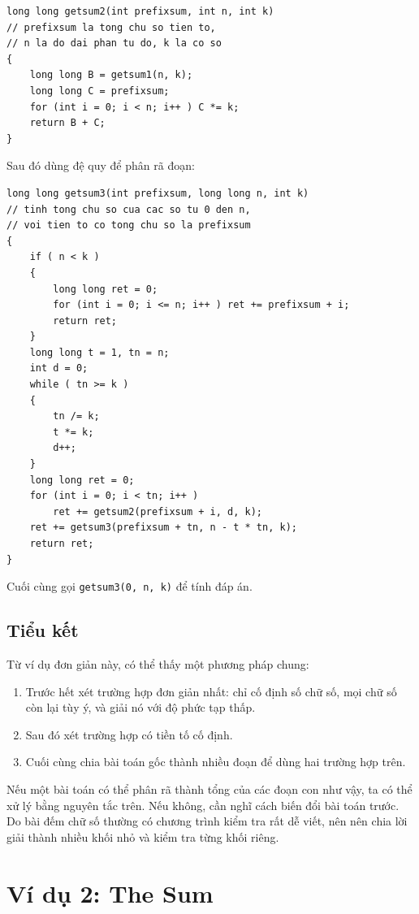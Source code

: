 \documentclass[11pt]{article}
\begin{document}
\begin{verbatim}
long long getsum2(int prefixsum, int n, int k)
// prefixsum la tong chu so tien to,
// n la do dai phan tu do, k la co so
{
    long long B = getsum1(n, k);
    long long C = prefixsum;
    for (int i = 0; i < n; i++ ) C *= k;
    return B + C;
}
\end{verbatim}

Sau đó dùng đệ quy để phân rã đoạn:

\begin{verbatim}
long long getsum3(int prefixsum, long long n, int k)
// tinh tong chu so cua cac so tu 0 den n,
// voi tien to co tong chu so la prefixsum
{
    if ( n < k )
    {
        long long ret = 0;
        for (int i = 0; i <= n; i++ ) ret += prefixsum + i;
        return ret;
    }
    long long t = 1, tn = n;
    int d = 0;
    while ( tn >= k )
    {
        tn /= k;
        t *= k;
        d++;
    }
    long long ret = 0;
    for (int i = 0; i < tn; i++ )
        ret += getsum2(prefixsum + i, d, k);
    ret += getsum3(prefixsum + tn, n - t * tn, k);
    return ret;
}
\end{verbatim}

Cuối cùng gọi \texttt{getsum3(0, n, k)} để tính đáp án.

\subsection*{Tiểu kết}

Từ ví dụ đơn giản này, có thể thấy một phương pháp chung:
\begin{enumerate}
  \item Trước hết xét trường hợp đơn giản nhất: chỉ cố định số chữ số, mọi chữ
  số còn lại tùy ý, và giải nó với độ phức tạp thấp.
  \item Sau đó xét trường hợp có tiền tố cố định.
  \item Cuối cùng chia bài toán gốc thành nhiều đoạn để dùng hai trường hợp
  trên.
\end{enumerate}

Nếu một bài toán có thể phân rã thành tổng của các đoạn con như vậy, ta có thể
xử lý bằng nguyên tắc trên. Nếu không, cần nghĩ cách biến đổi bài toán trước.
Do bài đếm chữ số thường có chương trình kiểm tra rất dễ viết, nên nên chia
lời giải thành nhiều khối nhỏ và kiểm tra từng khối riêng.

\section{Ví dụ 2: The Sum}
\end{document}
